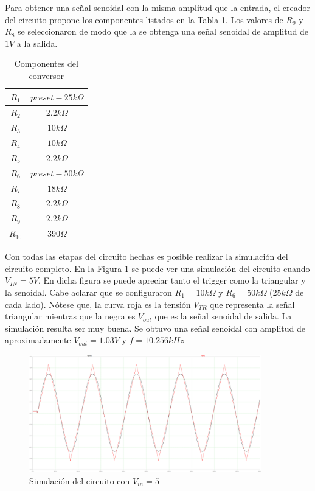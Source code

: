 Para obtener una señal senoidal con la misma amplitud que la entrada, el creador del circuito propone los componentes listados en la Tabla \ref{tab:componentes_conversor}. Los valores de $R_9$ y $R_8$ se seleccionaron de modo que la se obtenga una señal senoidal de amplitud de $1V$ a la salida. 

\begin{table}[h!]
    \centering
    \begin{tabular}{|c|c|}
    \hline
    $R_1$  & $preset- 25k \Omega$ \\ \hline
    $R_2$  & $2.2k\Omega$        \\ \hline
    $R_3$  & $10k \Omega$        \\ \hline
    $R_4$  & $10k\Omega$         \\ \hline
    $R_5$  & $2.2k\Omega$        \\ \hline
    $R_6$  & $preset- 50k \Omega$ \\ \hline
    $R_7$  & $18k \Omega$        \\ \hline
    $R_8$  & $2.2k \Omega$       \\ \hline
    $R_9$  & $2.2k \Omega$       \\ \hline
    $R_{10}$ & $390 \Omega$        \\ \hline
    \end{tabular}
    \caption{Componentes del conversor}
    \label{tab:componentes_conversor}
    \end{table}


Con todas las etapas del circuito hechas es posible realizar la simulación del circuito completo. En la Figura \ref{fig:sim_circuito_completo} se puede ver una simulación del circuito cuando $V_{IN} = 5V$. En dicha figura se puede apreciar tanto el trigger como la triangular y la senoidal. Cabe aclarar que se configuraron $R_1 = 10k \Omega$ y $R_6 = 50k \Omega$ ($25k \Omega$ de cada lado). Nótese que, la curva roja es la tensión $V_{TR}$ que representa la señal triangular mientras que la negra es $V_{out}$ que es la señal senoidal de salida. La simulación resulta ser muy buena. Se obtuvo una señal senoidal con amplitud de aproximadamente $V_{out}= 1.03V$ y $f = 10.256 kHz$

\begin{figure}[h!]                                                       
    \centering\includegraphics[width=0.9\textwidth]{../Ex3/Resources/sim_completo.png}
    \caption{Simulación del circuito con $V_{in} = 5$}
    \label{fig:sim_circuito_completo}
    \end{figure}


